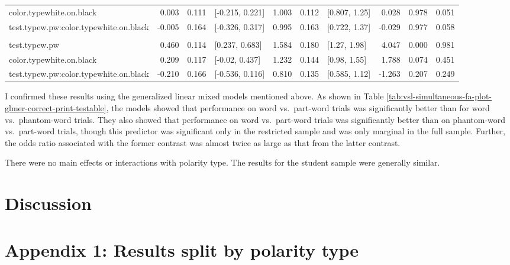 \documentclass[
]{article}
\begin{document}
\begin{longtable}[t]{lrrlrrlrrr}
\hspace{1em}color.typewhite.on.black & 0.003 & 0.111 & {}[-0.215, 0.221] & 1.003 & 0.112 & {}[0.807, 1.25] & 0.028 & 0.978 & 0.051\\
\hspace{1em}test.typew.pw:color.typewhite.on.black & -0.005 & 0.164 & {}[-0.326, 0.317] & 0.995 & 0.163 & {}[0.722, 1.37] & -0.029 & 0.977 & 0.058\\
\addlinespace[0.3em]
\multicolumn{10}{l}{\textbf{Restricted sample - w.pw vs. phw.pw}}\\
\hspace{1em}test.typew.pw & 0.460 & 0.114 & {}[0.237, 0.683] & 1.584 & 0.180 & {}[1.27, 1.98] & 4.047 & 0.000 & 0.981\\
\hspace{1em}color.typewhite.on.black & 0.209 & 0.117 & {}[-0.02, 0.437] & 1.232 & 0.144 & {}[0.98, 1.55] & 1.788 & 0.074 & 0.451\\
\hspace{1em}test.typew.pw:color.typewhite.on.black & -0.210 & 0.166 & {}[-0.536, 0.116] & 0.810 & 0.135 & {}[0.585, 1.12] & -1.263 & 0.207 & 0.249\\
\bottomrule
\end{longtable}

I confirmed these results using the generalized linear mixed models
mentioned above. As shown in Table
\ref{tab:vsl-simultaneous-fa-plot-glmer-correct-print-testable}, the
models showed that performance on word vs.~part-word trials was
significantly better than for word vs.~phantom-word trials. They also
showed that performance on word vs.~part-word trials was significantly
better than on phantom-word vs.~part-word trials, though this predictor
was significant only in the restricted sample and was only marginal in
the full sample. Further, the odds ratio associated with the former
contrast was almost twice as large as that from the latter contrast.

There were no main effects or interactions with polarity type. The
results for the student sample were generally similar.

\section{Discussion}\label{discussion}

\clearpage

\section{Appendix 1: Results split by polarity
type}\label{appendix-1-results-split-by-polarity-type}
\end{document}
